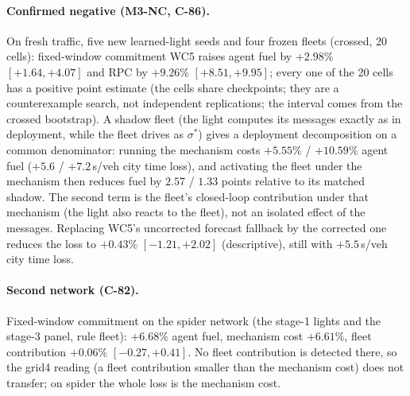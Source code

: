 \documentclass[11pt]{article}
\begin{document}
\paragraph{Confirmed negative (M3-NC, C-86).} On fresh traffic, five new learned-light seeds and four frozen fleets (crossed, 20 cells):
fixed-window commitment WC5 raises agent fuel by $+2.98\%$ $[+1.64, +4.07]$ and RPC by $+9.26\%$ $[+8.51, +9.95]$; every one of the 20
cells has a positive point estimate (the cells share checkpoints; they are a counterexample search, not independent replications; the
interval comes from the crossed bootstrap). A shadow fleet (the light computes its messages exactly as in deployment, while the fleet drives
as $\sigma^*$) gives a deployment decomposition on a common denominator: running the mechanism costs $+5.55\%$ / $+10.59\%$ agent fuel
($+5.6$ / $+7.2$\,s/veh city time loss), and activating the fleet under the mechanism then reduces fuel by $2.57$ / $1.33$ points relative to its
matched shadow. The second term is the fleet's closed-loop contribution under that mechanism (the light also reacts to the fleet), not an
isolated effect of the messages. Replacing WC5's uncorrected forecast fallback by the corrected
one reduces the loss to $+0.43\%$ $[-1.21, +2.02]$ (descriptive), still with $+5.5$\,s/veh city time loss.
\paragraph{Second network (C-82).} Fixed-window commitment on the spider network (the stage-1 lights and the stage-3 panel, rule fleet):
$+6.68\%$ agent fuel, mechanism cost $+6.61\%$, fleet contribution $+0.06\%$ $[-0.27, +0.41]$. No fleet contribution is detected there, so the
grid4 reading (a fleet contribution smaller than the mechanism cost) does not transfer; on spider the whole loss is the mechanism cost.
\end{document}
